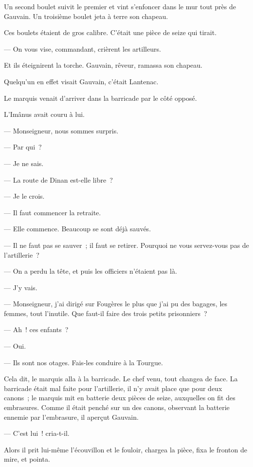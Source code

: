 \documentclass[french,twoside]{book} %
\begin{document}
Un second boulet suivit le premier et vint s’enfoncer dans le mur tout près de Gauvain. Un troisième boulet jeta à terre son chapeau.\par
Ces boulets étaient de gros calibre. C’était une pièce de seize qui tirait.\par
— On vous vise, commandant, crièrent les artilleurs.\par
Et ils éteignirent la torche. Gauvain, rêveur, ramassa son chapeau.\par
Quelqu’un en effet visait Gauvain, c’était Lantenac.\par
Le marquis venait d’arriver dans la barricade par le côté opposé.\par
L’Imânus avait couru à lui.\par
 — Monseigneur, nous sommes surpris.\par
— Par qui ?\par
— Je ne sais.\par
— La route de Dinan est-elle libre ?\par
— Je le crois.\par
— Il faut commencer la retraite.\par
— Elle commence. Beaucoup se sont déjà sauvés.\par
— Il ne faut pas se sauver ; il faut se retirer. Pourquoi ne vous servez-vous pas de l’artillerie ?\par
— On a perdu la tête, et puis les officiers n’étaient pas là.\par
— J’y vais.\par
— Monseigneur, j’ai dirigé sur Fougères le plus que j’ai pu des bagages, les femmes, tout l’inutile. Que faut-il faire des trois petits prisonniers ?\par
— Ah ! ces enfants ?\par
— Oui.\par
— Ils sont nos otages. Fais-les conduire à la Tourgue.\par
Cela dit, le marquis alla à la barricade. Le chef venu, tout changea de face. La barricade était mal faite pour l’artillerie, il n’y avait place que pour deux canons ; le marquis mit en batterie deux pièces de seize, auxquelles on fit des embrasures. Comme il était penché sur un des canons, observant la batterie ennemie par l’embrasure, il aperçut Gauvain.\par
— C’est lui ! cria-t-il.\par
Alors il prit lui-même l’écouvillon et le fouloir, chargea la pièce, fixa le fronton de mire, et pointa.\par
\end{document}
